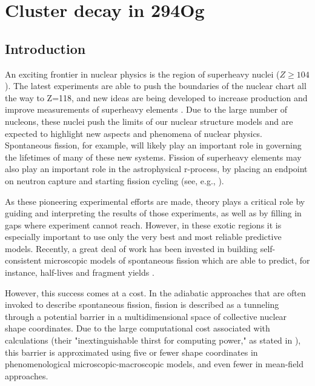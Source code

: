 \chapter{Cluster decay in 294Og}\label{chap:294Og}

\maketitle
\section{\label{sec:introduction}Introduction}

An exciting frontier in nuclear physics is the region of superheavy nuclei ($Z\geq104$). The latest experiments are able to push the boundaries of the nuclear chart all the way to Z=118, and new ideas are being developed to increase production and improve measurements of superheavy elements \cite{Dmitriev2016,Oganessian2016}. Due to the large number of nucleons, these nuclei push the limits of our nuclear structure models and are expected to highlight new aspects and phenomena of nuclear physics. Spontaneous fission, for example, will likely play an important role in governing the lifetimes of many of these new systems. Fission of superheavy elements may also play an important role in the astrophysical r-process, by placing an endpoint on neutron capture and starting fission cycling (see, e.g., \cite{Giuliani2017}).

As these pioneering experimental efforts are made, theory plays a critical role by guiding and interpreting the results of those experiments, as well as by filling in gaps where experiment cannot reach. However, in these exotic regions it is especially important to use only the very best and most reliable predictive models. Recently, a great deal of work has been invested in building self-consistent microscopic models of spontaneous fission which are able to predict, for instance, half-lives and fragment yields \cite{Sadhukhan2013,Sadhukhan2014,Sadhukhan2016,Sadhukhan2017}.

However, this success comes at a cost. In the adiabatic approaches that are often invoked to describe spontaneous fission, fission is described as a tunneling through a potential barrier in a multidimensional space of collective nuclear shape coordinates. Due to the large computational cost associated with calculations (their "inextinguishable thirst for computing power," as stated in \cite{Schunck2016-review}), this barrier is approximated using five or fewer shape coordinates in phenomenological microscopic-macroscopic models, and even fewer in mean-field approaches.

